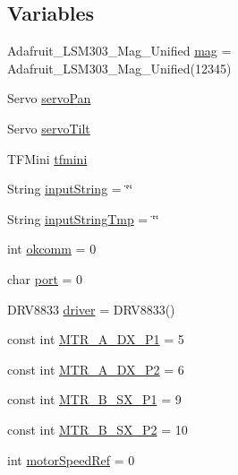 \subsection*{Variables}
\begin{DoxyCompactItemize}
\item 
Adafruit\+\_\+\+L\+S\+M303\+\_\+\+Mag\+\_\+\+Unified \mbox{\hyperlink{ari_pi__2_d_c__esp__08_8ino_a8358c2402fb15c1b0f5fbbfb0a1e6a85}{mag}} = Adafruit\+\_\+\+L\+S\+M303\+\_\+\+Mag\+\_\+\+Unified(12345)
\item 
Servo \mbox{\hyperlink{ari_pi__2_d_c__esp__08_8ino_aaf3c8c8d2e46ac81d19dda9e4213d6a1}{servo\+Pan}}
\item 
Servo \mbox{\hyperlink{ari_pi__2_d_c__esp__08_8ino_a1a47b66f30649678ffd87493fe397afd}{servo\+Tilt}}
\item 
T\+F\+Mini \mbox{\hyperlink{ari_pi__2_d_c__esp__08_8ino_aa556a72ca05ce9a3861b99c901bc58d6}{tfmini}}
\item 
String \mbox{\hyperlink{ari_pi__2_d_c__esp__08_8ino_abfa7bc4032f1ef9070aa48a183f30d4a}{input\+String}} = \char`\"{}\char`\"{}
\item 
String \mbox{\hyperlink{ari_pi__2_d_c__esp__08_8ino_a54b4b16653970eab34e2ba40199fd6f3}{input\+String\+Tmp}} = \char`\"{}\char`\"{}
\item 
int \mbox{\hyperlink{ari_pi__2_d_c__esp__08_8ino_a0f792197854bfeff54c46ebf012b2187}{okcomm}} = 0
\item 
char \mbox{\hyperlink{ari_pi__2_d_c__esp__08_8ino_a4b20c17190582b367bfba9b9bd5ea962}{port}} = 0
\item 
D\+R\+V8833 \mbox{\hyperlink{ari_pi__2_d_c__esp__08_8ino_ac547551c409b3659bcfa04a597e8d76b}{driver}} = D\+R\+V8833()
\item 
const int \mbox{\hyperlink{ari_pi__2_d_c__esp__08_8ino_ab8a00bd06cb46156aa7cb936b4eb8c85}{M\+T\+R\+\_\+\+A\+\_\+\+D\+X\+\_\+\+P1}} = 5
\item 
const int \mbox{\hyperlink{ari_pi__2_d_c__esp__08_8ino_a1daadb07ea3186bedb91de1bbfb47b58}{M\+T\+R\+\_\+\+A\+\_\+\+D\+X\+\_\+\+P2}} = 6
\item 
const int \mbox{\hyperlink{ari_pi__2_d_c__esp__08_8ino_a8b68fd0f29306f0feb3d5f3ac5c5c9b4}{M\+T\+R\+\_\+\+B\+\_\+\+S\+X\+\_\+\+P1}} = 9
\item 
const int \mbox{\hyperlink{ari_pi__2_d_c__esp__08_8ino_a77c90f26573c080620f9baca24364ebe}{M\+T\+R\+\_\+\+B\+\_\+\+S\+X\+\_\+\+P2}} = 10
\item 
int \mbox{\hyperlink{ari_pi__2_d_c__esp__08_8ino_ac179a794839296fb9b090264967b2dd9}{motor\+Speed\+Ref}} = 0

\end{DoxyCompactItemize}
